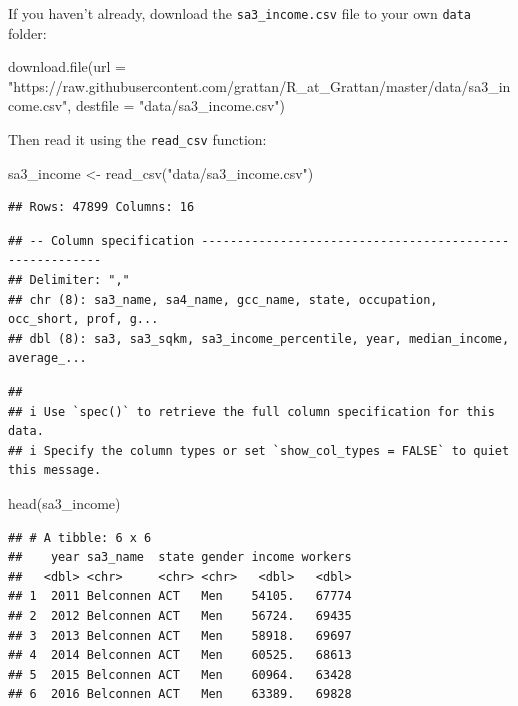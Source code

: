 \documentclass[
]{book}
\newenvironment{Shaded}{\begin{snugshade}}{\end{snugshade}}
\newcommand{\AttributeTok}[1]{\textcolor[rgb]{0.77,0.63,0.00}{#1}}
\newcommand{\FunctionTok}[1]{\textcolor[rgb]{0.00,0.00,0.00}{#1}}
\newcommand{\NormalTok}[1]{#1}
\newcommand{\OtherTok}[1]{\textcolor[rgb]{0.56,0.35,0.01}{#1}}
\newcommand{\StringTok}[1]{\textcolor[rgb]{0.31,0.60,0.02}{#1}}
\begin{document}
If you haven't already, download the \texttt{sa3\_income.csv} file to your own \texttt{data} folder:

\begin{Shaded}
\begin{Highlighting}[]
\FunctionTok{download.file}\NormalTok{(}\AttributeTok{url =} \StringTok{"https://raw.githubusercontent.com/grattan/R\_at\_Grattan/master/data/sa3\_income.csv"}\NormalTok{,}
              \AttributeTok{destfile =} \StringTok{"data/sa3\_income.csv"}\NormalTok{)}
\end{Highlighting}
\end{Shaded}

Then read it using the \texttt{read\_csv} function:

\begin{Shaded}
\begin{Highlighting}[]
\NormalTok{sa3\_income }\OtherTok{\textless{}{-}} \FunctionTok{read\_csv}\NormalTok{(}\StringTok{"data/sa3\_income.csv"}\NormalTok{)}
\end{Highlighting}
\end{Shaded}

\begin{verbatim}
## Rows: 47899 Columns: 16
\end{verbatim}

\begin{verbatim}
## -- Column specification --------------------------------------------------------
## Delimiter: ","
## chr (8): sa3_name, sa4_name, gcc_name, state, occupation, occ_short, prof, g...
## dbl (8): sa3, sa3_sqkm, sa3_income_percentile, year, median_income, average_...
\end{verbatim}

\begin{verbatim}
## 
## i Use `spec()` to retrieve the full column specification for this data.
## i Specify the column types or set `show_col_types = FALSE` to quiet this message.
\end{verbatim}

\begin{Shaded}
\begin{Highlighting}[]
\FunctionTok{head}\NormalTok{(sa3\_income)}
\end{Highlighting}
\end{Shaded}

\begin{verbatim}
## # A tibble: 6 x 6
##    year sa3_name  state gender income workers
##   <dbl> <chr>     <chr> <chr>   <dbl>   <dbl>
## 1  2011 Belconnen ACT   Men    54105.   67774
## 2  2012 Belconnen ACT   Men    56724.   69435
## 3  2013 Belconnen ACT   Men    58918.   69697
## 4  2014 Belconnen ACT   Men    60525.   68613
## 5  2015 Belconnen ACT   Men    60964.   63428
## 6  2016 Belconnen ACT   Men    63389.   69828
\end{verbatim}
\end{document}
